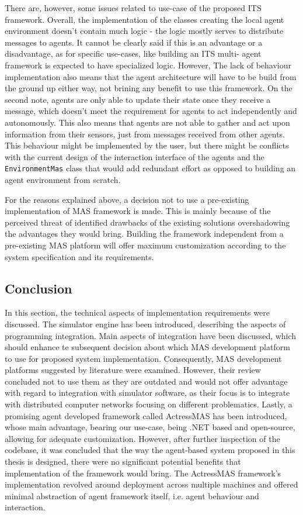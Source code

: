 \documentclass[main.tex]{subfiles}
\begin{document}
There are, however, some issues related to use-case of the proposed ITS framework. Overall, the implementation of the classes 
creating the local agent environment doesn't contain much logic - the logic mostly serves to distribute messages to agents. 
It cannot be clearly said if this is an advantage or a disadvantage, as for specific use-cases, like building an ITS multi-
agent framework is expected to have specialized logic. However, The lack of behaviour implementation also means that the 
agent architecture will have to be build from the ground up either way, not brining any benefit to use this framework. 
On the second note, agents are only able to update their state once they receive a message, which doesn't 
meet the requirement for agents to act independently and autonomously. This also means that agents are not able to gather 
and act upon information from their sensors, just from messages received from other agents. This behaviour might be implemented 
by the user, but there might be conflicts with the current design of the interaction interface of the agents and the 
\texttt{EnvironmentMas} class that would add redundant effort as opposed to building an agent environment from scratch. 

For the reasons explained above, a decision not to use a pre-existing implementation of MAS framework is made. This 
is mainly because of the perceived threat of identified drawbacks of the existing solutions overshadowing the advantages 
they would bring. Building the framework independent from a pre-existing MAS platform will offer maximum customization 
according to the system specification and its requirements. 

\subsection{Conclusion}

In this section, the technical aspects of implementation requirements were discussed. The
simulator engine has been introduced, describing the aspects of programming integration. Main
aspects of integration have been discussed, which should enhance te subsequent decision about
which MAS development platform to use for proposed system implementation. Consequently, MAS
development platforms suggested by literature were examined.  However, their review concluded
not to use them as they are outdated and would not offer advantage with regard to integration
with simulator software, as their focus is to integrate with distributed computer networks
focusing on different problematics. Lastly, a promising agent developed framework called 
ActressMAS has been introduced, whose main advantage, bearing our use-case, being .NET based
and open-source, allowing for adequate customization. However, after further inspection of the
codebase, it was concluded that the way the agent-based system proposed in this thesis is
designed, there were no significant potential benefits that implementation of the framework 
would bring. The ActressMAS framework's implementation revolved around deployment across 
multiple machines and offered minimal abstraction of agent framework itself, i.e. 
agent behaviour and interaction.

\clearpage
\end{document}
